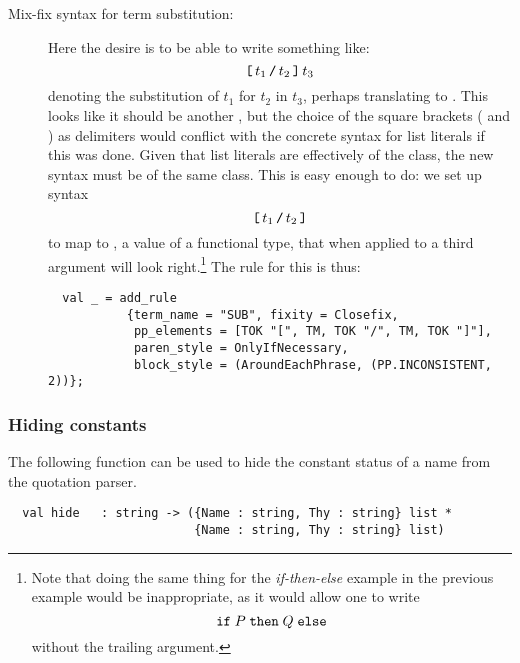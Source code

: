 {\begin{description}
\item[Mix-fix syntax for term substitution:]

Here the desire is to be able to write something like:
\[
  \mbox{\texttt{[}}\,t_1\,\mbox{\texttt{/}}\,t_2\,\mbox{\texttt{]}}\,t_3
\]
denoting the substitution of $t_1$ for $t_2$ in $t_3$, perhaps
translating to .  This looks
like it should be another , but the choice of the
square brackets (\holtxt{[} and \holtxt{]}) as delimiters would
conflict with the concrete syntax for list literals if this was done.
Given that list literals are effectively of the 
class, the new syntax must be of the same class.  This is easy enough
to do: we set up syntax
\[
\holtxt{[}\,t_1\,\holtxt{/}\,t_2\,\holtxt{]}
\]
to map to , a value of a functional
type, that when applied to a third argument will look
right.\footnote{Note that doing the same thing for the
  \textit{if-then-else} example in the previous example would be
  inappropriate, as it would allow one to write
\[ \holtxt{if}\;P\;\holtxt{then}\;Q\;\holtxt{else} \]
without the trailing argument.}
The rule for this is thus:
\begin{hol}
\begin{verbatim}
  val _ = add_rule
           {term_name = "SUB", fixity = Closefix,
            pp_elements = [TOK "[", TM, TOK "/", TM, TOK "]"],
            paren_style = OnlyIfNecessary,
            block_style = (AroundEachPhrase, (PP.INCONSISTENT, 2))};
\end{verbatim}
\end{hol}

\end{description}

\subsubsection{Hiding constants}
\label{hidden}

%
The following function can be used to hide the constant status of a
name from the quotation parser.

\begin{boxed}
\begin{verbatim}
  val hide   : string -> ({Name : string, Thy : string} list *
                          {Name : string, Thy : string} list)
\end{verbatim}
\end{boxed}

}
